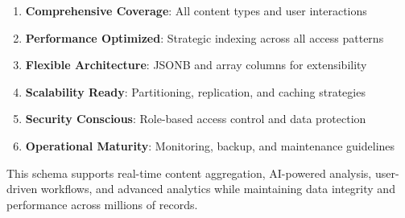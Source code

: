\documentclass[12pt,a4paper]{report}
\begin{document}
\begin{enumerate}
    \item \textbf{Comprehensive Coverage}: All content types and user interactions
    \item \textbf{Performance Optimized}: Strategic indexing across all access patterns
    \item \textbf{Flexible Architecture}: JSONB and array columns for extensibility
    \item \textbf{Scalability Ready}: Partitioning, replication, and caching strategies
    \item \textbf{Security Conscious}: Role-based access control and data protection
    \item \textbf{Operational Maturity}: Monitoring, backup, and maintenance guidelines
\end{enumerate}

This schema supports real-time content aggregation, AI-powered analysis, user-driven workflows, and advanced analytics while maintaining data integrity and performance across millions of records.
\end{document}
